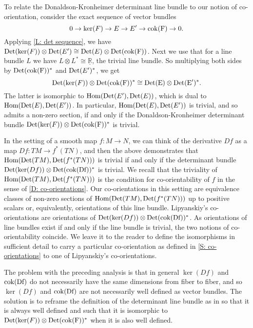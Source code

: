 \documentclass[12pt]{article}
\theoremstyle{plain}
\theoremstyle{definition}
\theoremstyle{remark}
\newcommand{\R}{\mathbb{R}}
\newcommand{\Hom}{\text{Hom}}
\newcommand{\cok}{\rm{cok}}
\newcommand{\Or}{{\rm Det}}
\begin{document}
To relate the Donaldson-Kronheimer determinant line bundle to our notion of co-orientation, consider the exact sequence of vector bundles
\begin{equation*}
0\to \ker(F) \to  E \to E' \to \cok(F) \to 0.
\end{equation*}
Applying \cref{L: det sequence}, we have $\Or(\ker(F))\otimes \Or(E')\cong \Or(E)\otimes \Or(\cok(F))$. Next we use that for a line bundle $L$ we have $L\otimes L^*\cong \underline{\R}$, the trivial line bundle. So multiplying both sides by $\Or(\cok(F))^*$ and $\Or(E')^*$, we get $$\Or(\ker(F))\otimes \Or(\cok(F))^*\cong \Or(E)\otimes \Or(E')^*.$$
The latter is isomorphic to $\Hom(\Or(E'),\Or(E))$, which is dual to $\Hom(\Or(E),\Or(E'))$. In particular, $\Hom(\Or(E),\Or(E'))$ is trivial, and so admits a non-zero section, if and only if the Donaldson-Kronheimer determinant bundle $\Or(\ker(F))\otimes \Or(\cok(F))^*$ is trivial. 

In the setting of a smooth map $f:M\to N$, we can think of the derivative $Df$ as a map $Df:TM\to f^*(TN)$, and then the above demonstrates that $\Hom(\Or(TM),\Or(f^*(TN)))$ is trivial if and only if the determinant bundle $\Or(\ker(Df))\otimes \Or(\cok(Df))^*$ is trivial. We recall that the triviality of $\Hom(\Or(TM),\Or(f^*(TN)))$ is the condition for co-orientability of $f$ in the sense of \cref{D: co-orientations}.  Our co-orientations in this setting are equivalence classes of non-zero sections of $\Hom(\Or(TM),\Or(f^*(TN)))$ up to positive scalars or, equivalently, orientations of this line bundle. Lipyanskiy's co-orientations are orientations of $\Or(\ker(Df))\otimes \Or(\cok(Df))^*$. As orientations of line bundles exist if and only if the line bundle is trivial, the two notions of co-orientability coincide. We leave it to the reader to define the isomorphisms in sufficient detail to carry a particular co-orientation as defined in \cref{S: co-orientations} to one of Lipyanskiy's co-orientations.






The problem with the preceding analysis is that in general $\ker(Df)$ and $\cok(Df)$ do not necessarily have the same dimensions from fiber to fiber, and so $\ker(Df)$ and $\cok(Df)$ are not necessarily well defined as vector bundles. The solution is to reframe the definition of the determinant line bundle as in \cite{DoKr90} so that it is always well defined and such that it is isomorphic to $\Or(\ker(F))\otimes \Or(\cok(F))^*$ when it is also well defined. 
\end{document}

